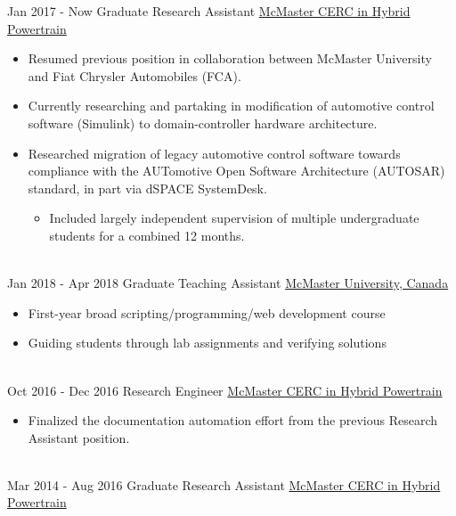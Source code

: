 \documentclass[letterpaper]{twentysecondcv} %
\begin{document}
\vspace{-.5em}
\begin{twenty} %
  \twentyitem
  {Jan 2017 -}
  {Now}
  {Graduate Research Assistant}
  {%
    \href{http://hybrid.mcmaster.ca/}{McMaster CERC in Hybrid Powertrain}}
  {}
  {\begin{itemize}
      \item Resumed previous position in collaboration between McMaster University and Fiat Chrysler Automobiles (FCA).
      \item Currently researching and partaking in modification of automotive control software (Simulink) to domain-controller hardware architecture.
			\item Researched migration of legacy automotive control software towards compliance with the AUTomotive Open Software Architecture (AUTOSAR) standard, in part via dSPACE SystemDesk.
      \begin{itemize}
        \item Included largely independent supervision of multiple undergraduate students for a combined 12 months.
      \end{itemize}
	\end{itemize}}
	\\
  \twentyitem
  {Jan 2018 -}
  {Apr 2018}
  {Graduate Teaching Assistant}
  {\href{https://www.mcmaster.ca/}{McMaster University, Canada}}
  {}
  {\begin{itemize}
      \item First-year broad scripting/programming/web development course
      \item Guiding students through lab assignments and verifying solutions
  \end{itemize}}
  \\
	\twentyitem
	{Oct 2016 -}
	{Dec 2016}
	{Research Engineer}
	{\href{http://hybrid.mcmaster.ca/}{McMaster CERC in Hybrid Powertrain}}
	{}
	{\begin{itemize}
			\item Finalized the documentation automation effort from the previous
			Research Assistant position.
	\end{itemize}}
	\\
  \twentyitem
	{Mar 2014 -}
	{Aug 2016}
	{Graduate Research Assistant}
	{\href{http://hybrid.mcmaster.ca/}{McMaster CERC in Hybrid Powertrain}}
	{}
	{\begin{itemize}

\end{itemize}}
\end{twenty}
\end{document}
